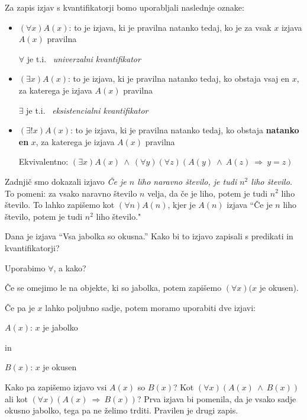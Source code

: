 \documentclass[11pt,paper=b5,DIV=13,headinclude,footinclude]{scrbook}
\newcounter{example}
\def\inn {{~\wedge~}}
\def\sledi {{~\Rightarrow~}}
\begin{document}
Za zapis izjav s kvantifikatorji bomo uporabljali naslednje oznake:
\begin{itemize}
  \item
  $(\forall x) A(x)$: to je izjava, ki je pravilna natanko tedaj, ko je za vsak $x$ izjava $A(x)$ pravilna

$\forall$ je t.i.~\emph{ univerzalni kvantifikator}
  \item
  $(\exists  x) A(x)$: to je izjava, ki je pravilna natanko tedaj, ko obstaja vsaj en $x$, za katerega je izjava $A(x)$ pravilna

$\exists$ je t.i.~\emph{ eksistencialni kvantifikator}

  \item
  $(\exists!  x) A(x)$: to je izjava, ki je pravilna natanko tedaj, ko obstaja \textbf{ natanko en} $x$, za katerega je izjava $A(x)$ pravilna

Ekvivalentno: $(\exists x)A(x) \inn (\forall y)(\forall z)(A(y) \inn A(z) \sledi y = z)$
\end{itemize}

\begin{example*}
Zadnjič smo dokazali izjavo \emph{ Če je $n$ liho naravno število, je tudi $n^2$ liho število.}
To pomeni: za vsako naravno število $n$ velja, da če je liho, potem je tudi $n^2$ liho število.
To lahko zapišemo kot $(\forall n)A(n)$, kjer je $A(n)$ izjava ``Če je $n$ liho število, potem je tudi $n^2$ liho število."
\end{example*}

\medskip
\begin{sloppypar}
\begin{example*}
Dana je izjava ``Vsa jabolka so okusna.''
Kako bi to izjavo zapisali s predikati in kvantifikatorji?

Uporabimo $\forall$, a kako?

Če se omejimo le na objekte, ki so jabolka, potem zapišemo $(\forall x)(x$ je okusen).

Če pa je $x$ lahko poljubno sadje, potem moramo uporabiti dve izjavi:

$A(x)$: $x$ je jabolko

 in

$B(x)$: $x$ je okusen

Kako pa zapišemo izjavo vsi $A(x)$ so $B(x)$? Kot $(\forall x)(A(x)\inn B(x))$
ali kot $(\forall x)(A(x) \sledi B(x))$?
Prva izjava bi pomenila, da je vsako sadje okusno jabolko, tega pa ne želimo trditi. Pravilen je drugi zapis.
\end{example*}
\end{sloppypar}
\end{document}
